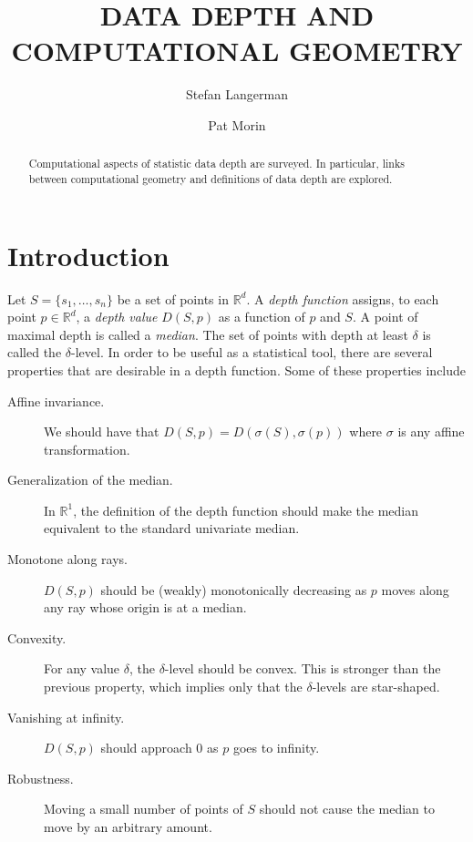 \documentclass[lotsofwhite,charterfonts]{patmorin}
\title{\MakeUppercase{Data Depth and Computational Geometry}}
\author{Stefan Langerman \and Pat Morin}
\date{}
\begin{document}
\maketitle

\begin{abstract}
Computational aspects of statistic data depth are surveyed.  In
particular, links between computational geometry and definitions of
data depth are explored.
\end{abstract}

\newpage

\tableofcontents

\newpage

\section{Introduction}

Let $S=\{s_1,\ldots,s_n\}$ be a set of points in $\mathbb{R}^d$.  A
\emph{depth function} assigns, to each point $p\in \mathbb{R}^d$, a
\emph{depth value} $D(S,p)$ as a function of $p$ and $S$.  A point of
maximal depth is called a \emph{median}.  The set of points with depth
at least $\delta$ is called the $\delta$-level.  In order to be useful
as a statistical tool, there are several properties that are desirable
in a depth function.  Some of these properties include \cite{zs00a}

\begin{description}

\item[Affine invariance.]  We should have that
$D(S,p)=D(\sigma(S),\sigma(p))$ where $\sigma$ is any affine
transformation.

\item[Generalization of the median.]  In $\mathbb{R}^1$, the
definition of the depth function should make the median equivalent to
the standard univariate median.

\item[Monotone along rays.]  $D(S,p)$ should be (weakly) monotonically
decreasing as $p$ moves along any ray whose origin is at a median.

\item[Convexity.]  For any value $\delta$, the $\delta$-level should
be convex.  This is stronger than the previous property, which implies
only that the $\delta$-levels are star-shaped.

\item[Vanishing at infinity.] $D(S,p)$ should approach 0 as $p$ goes to
infinity.

\item[Robustness.]  Moving a small number of points of $S$ should not
cause the median to move by an arbitrary amount.  \end{description}
\end{document}
